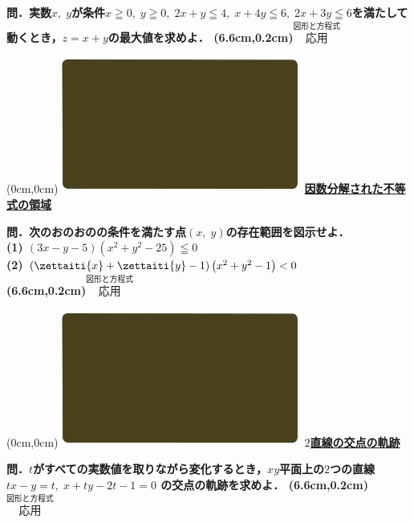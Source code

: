 \documentclass[10pt,
fleqn,
dvipdfmx,
uplatex
]{jsarticle}
\begin{document}
\Large 
\bf\boldmath 問．実数$x,\;y$が条件$x\geqq 0,\;y\geqq 0,\;2x+y\leqq 4,\;x+4y\leqq 6,\;2x+3y\leqq 6$を満たして動くとき，$z=x+y$の最大値を求めよ．
\at(6.6cm,0.2cm){\small\color{bradorange}$\overset{\text{図形と方程式}}{\text{応用}}$}


\newpage



\at(0cm,0cm){\includegraphics[width=8cm,bb=0 0 1920 1080]{./youtube/thumbnails/templates/smart_background/図形と方程式.jpeg}}
{\color{orange}\bf\boldmath\Large\underline{因数分解された不等式の領域}}\vspace{0.3zw}

\Large 
\bf\boldmath 問．次のおのおのの条件を満たす点$\left(x,\;y\right)$の存在範囲を図示せよ．\\
(1)  $\left(3x-y-5\right)\left(x^2+y^2-{25}\right)\leqq 0$\\
(2)  $\left(\zettaiti{x}+\zettaiti{y}-1\right)\left(x^2+y^2-1\right)<0$\\

\at(6.6cm,0.2cm){\small\color{bradorange}$\overset{\text{図形と方程式}}{\text{応用}}$}


\newpage



\at(0cm,0cm){\includegraphics[width=8cm,bb=0 0 1920 1080]{./youtube/thumbnails/templates/smart_background/図形と方程式.jpeg}}
{\color{orange}\bf\boldmath\huge\underline{$2$直線の交点の軌跡}}\vspace{0.3zw}

\Large 
\bf\boldmath 問．$t$がすべての実数値を取りながら変化するとき，$xy$平面上の$2$つの直線$tx-y=t,\;x+ty-2t-1=0$
の交点の軌跡を求めよ．
\at(6.6cm,0.2cm){\small\color{bradorange}$\overset{\text{図形と方程式}}{\text{応用}}$}
\end{document}
